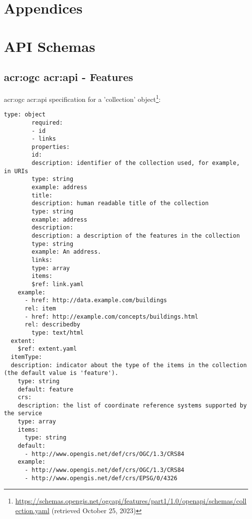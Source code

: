 \begin{appendix}
    \chapter*{Appendices}
    \label{cha:appendices}



    \chapter{API Schemas}

    \section[OGC API - Features]{\acrshort{acr:ogc} \acrshort{acr:api} - Features}

    \acrshort{acr:ogc} \acrshort{acr:api} specification for a 'collection' object\footnote{\url{https://schemas.opengis.net/ogcapi/features/part1/1.0/openapi/schemas/collection.yaml} (retrieved October 25, 2023)}:

    \begin{lstlisting}[style=yaml]
        type: object
        required:
        - id
        - links
        properties:
        id:
        description: identifier of the collection used, for example, in URIs
        type: string
        example: address
        title:
        description: human readable title of the collection
        type: string
        example: address
        description:
        description: a description of the features in the collection
        type: string
        example: An address.
        links:
        type: array
        items:
        $ref: link.yaml
    example:
      - href: http://data.example.com/buildings
      rel: item
      - href: http://example.com/concepts/buildings.html
      rel: describedby
        type: text/html
  extent:
    $ref: extent.yaml
  itemType:
  description: indicator about the type of the items in the collection (the default value is 'feature').
    type: string
    default: feature
    crs:
    description: the list of coordinate reference systems supported by the service
    type: array
    items:
      type: string
    default:
      - http://www.opengis.net/def/crs/OGC/1.3/CRS84
    example:
      - http://www.opengis.net/def/crs/OGC/1.3/CRS84
      - http://www.opengis.net/def/crs/EPSG/0/4326
    \end{lstlisting}


\end{appendix}
